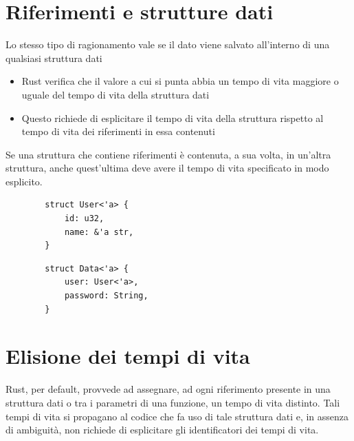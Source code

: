 \section{Riferimenti e strutture dati}

Lo stesso tipo di ragionamento vale se il dato viene salvato all'interno di una
qualsiasi struttura dati

\begin{itemize}
  \item Rust verifica che il valore a cui si punta abbia un tempo di vita maggiore o uguale del tempo di vita della struttura dati
  \item Questo richiede di esplicitare il tempo di vita della struttura rispetto al tempo di vita dei riferimenti in essa contenuti
\end{itemize}

Se una struttura che contiene riferimenti è contenuta, a sua volta, in un'altra
struttura, anche quest'ultima deve avere il tempo di vita specificato in modo
esplicito.

\begin{center}
  \begin{minipage}{1\linewidth}
    \begin{minipage}{0.50\linewidth}
      \begin{verbatim}
        struct User<'a> {
            id: u32,
            name: &'a str,
        }        
\end{verbatim}
    \end{minipage}%
    \hfill %
    \begin{minipage}{0.50\linewidth}
      \begin{verbatim}
        struct Data<'a> {
            user: User<'a>,
            password: String,
        }     
\end{verbatim}
    \end{minipage}
  \end{minipage}
\end{center}


\section{Elisione dei tempi di vita}

Rust, per default, provvede ad assegnare, ad ogni riferimento presente in una struttura dati o tra i parametri di una funzione, un tempo di vita distinto. Tali tempi di vita si propagano al codice che fa uso di tale struttura dati e, in assenza di ambiguità, non richiede di esplicitare gli identificatori dei tempi di vita.

